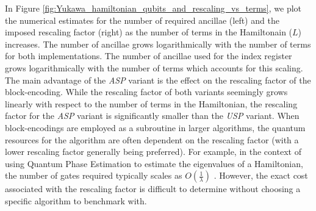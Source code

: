 In Figure \ref{fig:Yukawa_hamiltonian_qubits_and_rescaling_vs_terms}, we plot the numerical estimates for the number of required ancillae (left) and the imposed rescaling factor (right) as the number of terms in the Hamiltonain ($L$) increases.
The number of ancillae grows logarithmically with the number of terms for both implementations.
The number of ancillae used for the index register grows logarithmically with the number of terms which accounts for this scaling.
The main advantage of the \textit{ASP} variant is the effect on the rescaling factor of the block-encoding.
While the rescaling factor of both variants seemingly grows linearly with respect to the number of terms in the Hamiltonian, the rescaling factor for the \textit{ASP} variant is significantly smaller than the \textit{USP} variant.
When block-encodings are employed as a subroutine in larger algorithms, the quantum resources for the algorithm are often dependent on the rescaling factor (with a lower rescaling factor generally being preferred).
For example, in the context of using Quantum Phase Estimation to estimate the eigenvalues of a Hamiltonian, the number of gates required typically scales as $O(\frac{1}{\lambda})$ \cite{babbush2018encoding}. 
However, the exact cost associated with the rescaling factor is difficult to determine without choosing a specific algorithm to benchmark with.

